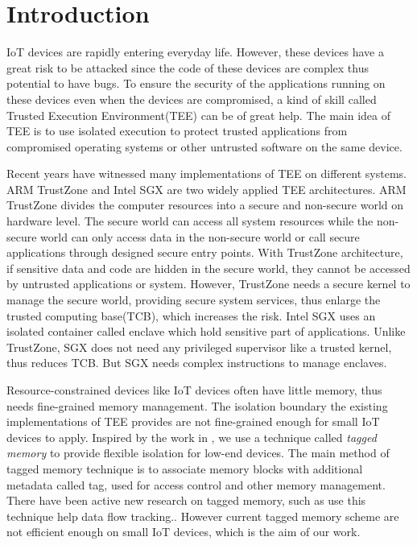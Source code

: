 \documentclass[conference]{IEEEtran}
\begin{document}
\section{Introduction}
IoT devices are rapidly entering everyday life. However, these devices have a great risk to be attacked since the code of these devices are complex thus potential to have bugs. To ensure the security of the applications running on these devices even when the devices are compromised, a kind of skill called Trusted Execution Environment(TEE) can be of great help. The main idea of TEE is to use isolated execution to protect trusted applications from compromised operating systems or other untrusted software on the same device.

Recent years have witnessed many implementations of TEE on different systems. ARM TrustZone and Intel SGX are two widely applied TEE architectures. ARM TrustZone divides the computer resources into a secure and non-secure world on hardware level.\cite{TrustZone} The secure world can access all system resources while the non-secure world can only access data in the non-secure world or call secure applications through designed secure entry points. With TrustZone architecture, if sensitive data and code are hidden in the secure world, they cannot be accessed by untrusted applications or system. However, TrustZone needs a secure kernel to manage the secure world, providing secure system services, thus enlarge the trusted computing base(TCB), which increases the risk. Intel SGX uses an isolated container called enclave which hold sensitive part of applications.\cite{SGX} Unlike TrustZone, SGX does not need any privileged supervisor like a trusted kernel, thus reduces TCB. But SGX needs complex instructions to manage enclaves.

Resource-constrained devices like IoT devices often have little memory, thus needs fine-grained memory management. The isolation boundary the existing implementations of TEE provides are not fine-grained enough for small IoT devices to apply. Inspired by the work in \cite{TIMBERV}, we use a technique called \emph{tagged memory} to provide flexible isolation for low-end devices. The main method of tagged memory technique is to associate memory blocks with additional metadata called tag, used for access control and other memory management. There have been active new research on tagged memory, such as use this technique help data flow tracking.\cite{HDFI}. However current tagged memory scheme are not efficient enough on small IoT devices\cite{TIMBERV}, which is the aim of our work.
\end{document}
